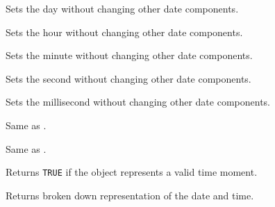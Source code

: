 Sets the day without changing other date components.

\label{wxdatetimesethour}


Sets the hour without changing other date components.

\label{wxdatetimesetminute}


Sets the minute without changing other date components.

\label{wxdatetimesetsecond}


Sets the second without changing other date components.

\label{wxdatetimesetmillisecond}


Sets the millisecond without changing other date components.

\label{wxdatetimeoperatoreqtimet}


Same as .

\label{wxdatetimeoperatoreqtm}


Same as .


\label{wxdatetimeisvalid}


Returns {\tt TRUE} if the object represents a valid time moment.

\label{wxdatetimegettm}


Returns broken down representation of the date and time.

